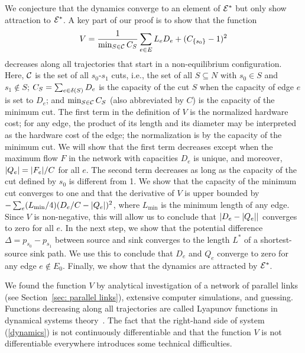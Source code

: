 \documentclass[11pt,a4paper]{article}
\renewcommand{\source}{\ensuremath{s_0}}
\renewcommand{\sink}{\ensuremath{s_1}}
\newcommand{\Lmin}{\ensuremath{L_{\mathrm{min}}}}
\newcommand{\E}{\cal E}
\newcommand{\Estar}{\E^*}
\begin{document}
We conjecture that the dynamics converge to an element of $\Estar$ but only
show attraction to $\Estar$. A key part of our proof is to show that the function
\begin{equation}\label{eq: defintion of V}
V = \frac{1}{\min_{S \in \calC} \capa(S)} \sum_{e \in E} L_e D_e + (\capa(\{ \source \})-1)^2 \end{equation}
decreases along all trajectories that start in a non-equilibrium
configuration. Here, ${\cal C}$ is the set of all $\source$-$\sink$ cuts, i.e.,
the set of all $S \subseteq N$ with $\source \in S$ and $\sink \not\in S$;
$\capa(S) = \sum_{e \in \delta(S)} D_e$ is the capacity of the cut $S$ when the
capacity of edge $e$ is set to $D_e$; and $\min_{S \in \calC} \capa(S)$ (also
abbreviated by $C$) is the capacity of the minimum cut. The first term in the
definition of $V$ is the normalized hardware cost; for any edge, the product of
its length and its diameter may be interpreted as the hardware cost of the
edge; the normalization is by the capacity of the minimum cut. We will show
that the first term
decreases except when the maximum flow $F$ in
the network with capacities $D_e$ is unique, and moreover, 
$| Q_e | = | F_e |/C$ for all $e$. The second term decreases as long as the
capacity of the cut defined by $\source$ is different from 1. We show that the
capacity of the minimum cut converges to one and that the derivative of
$V$ is upper bounded by $- \sum_e (\Lmin/4) (D_e/C - \abs{Q_e})^2$, where $\Lmin$
is the minimum length of any edge. Since $V$ is
non-negative, this will allow us to conclude 
that $| D_e - | Q_e | |$ converges
to zero for all $e$. In the next step, we show that the potential difference
$\Delta = p_{\source} - p_{\sink}$ between source and sink converges to the
length $L^*$ of a shortest-source sink path. We use this to conclude that $D_e$
and $Q_e$ converge to zero for any edge $e \not\in E_0$. Finally, we show that
the dynamics are attracted by $\Estar$.  

We
found the function $V$ by analytical investigation of a network of
parallel links (see Section~\ref{sec: parallel links}), extensive
computer simulations, and guessing.  
%
Functions decreasing along all trajectories are called Lyapunov functions in
dynamical systems theory~\cite{Hirsch-Smale}. The fact that the right-hand side
of system (\ref{dynamics}) is not continuously differentiable and that the function $V$ is not
differentiable everywhere introduces some technical difficulties. \smallskip
\end{document}

